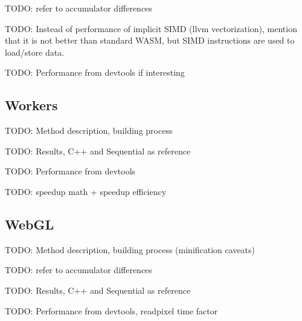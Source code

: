 TODO: refer to accumulator differences

TODO: Instead of performance of implicit SIMD (llvm vectorization), mention that it is not better than standard WASM, but SIMD instructions are used to load/store data.

%

TODO: Performance from devtools if interesting

\subsection{Workers}

TODO: Method description, building process

TODO: Results, C++ and Sequential as reference



TODO: Performance from devtools

TODO: speedup math + speedup efficiency

\subsection{WebGL}

TODO: Method description, building process (minification caveats)

TODO: refer to accumulator differences

TODO: Results, C++ and Sequential as reference



TODO: Performance from devtools, readpixel time factor
